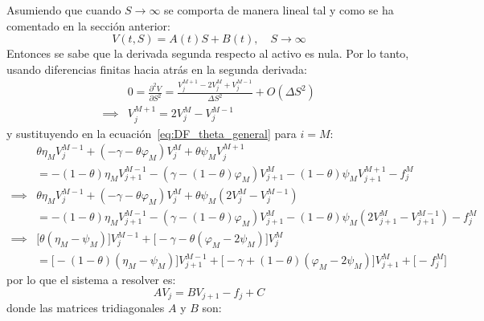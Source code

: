 Asumiendo que cuando $S\to\infty$ se comporta de manera lineal tal y como se ha comentado en la sección anterior:
\begin{equation*}
    \boxed{V(t, S) = A(t) S + B(t), \quad S \to \infty}
\end{equation*}
Entonces se sabe que la derivada segunda respecto al activo es nula. Por lo tanto, usando diferencias finitas hacia atrás en la segunda derivada:
\begin{align*}
    &0 = \frac{\partial^2 V}{\partial S^2} = \frac{V_j^{M+1} - 2V_j^{M} + V_j^{M-1}}{\Delta S^2} + O(\Delta S^2) \\
    \implies &V_j^{M+1} = 2V_j^{M} - V_j^{M-1}
\end{align*}
y sustituyendo en la ecuación~\eqref{eq:DF_theta_general} para $i=M$:
\begin{align*}
    &\theta\eta_M V_j^{M-1} +\left( -\gamma - \theta \varphi_M \right)V_j^M +\theta\psi_M V_j^{M+1} \\
    &= - (1-\theta)\eta_M V_{j+1}^{M-1} -\left( \gamma - (1-\theta) \varphi_M \right)V_{j+1}^M - (1-\theta)\psi_M V_{j+1}^{M+1} - f_j^M \\
    \implies &\theta\eta_M V_j^{M-1} +\left( -\gamma - \theta \varphi_M \right)V_j^M +\theta\psi_M \left(2V_j^{M} - V_j^{M-1}\right) \\
    &= - (1-\theta)\eta_M V_{j+1}^{M-1} -\left( \gamma - (1-\theta) \varphi_M \right)V_{j+1}^M - (1-\theta)\psi_M \left(2V_{j+1}^{M} - V_{j+1}^{M-1}\right) - f_j^M \\
    \implies &\bigg[ \theta(\eta_M - \psi_M) \bigg] V_j^{M-1} + \bigg[ -\gamma - \theta (\varphi_M - 2\psi_M) \bigg] V_j^M\\
    &= \bigg[ - (1-\theta)(\eta_M - \psi_M) \bigg] V_{j+1}^{M-1} + \bigg[ - \gamma + (1-\theta) (\varphi_M - 2\psi_M) \bigg] V_{j+1}^M + \bigg[ - f_j^M \bigg]
\end{align*}
por lo que el sistema a resolver es:
\begin{equation*}
    \boxed{A V_j = B V_{j+1} - f_j + C}
\end{equation*}
donde las matrices tridiagonales $A$ y $B$ son:
